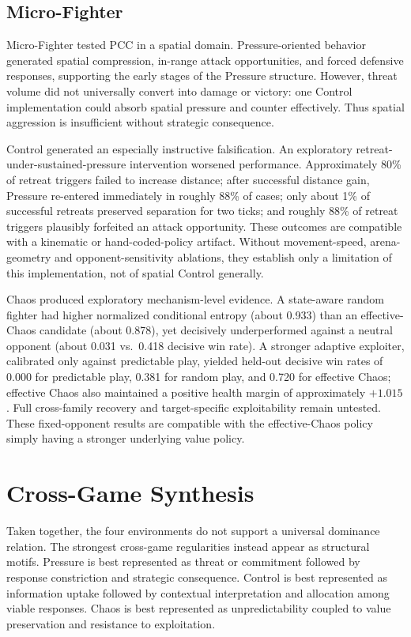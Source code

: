 \documentclass[journal]{IEEEtran}
\begin{document}
\subsection{Micro-Fighter}

Micro-Fighter tested PCC in a spatial domain. Pressure-oriented behavior generated spatial compression, in-range attack opportunities, and forced defensive responses, supporting the early stages of the Pressure structure. However, threat volume did not universally convert into damage or victory: one Control implementation could absorb spatial pressure and counter effectively. Thus spatial aggression is insufficient without strategic consequence.

Control generated an especially instructive falsification. An exploratory retreat-under-sustained-pressure intervention worsened performance. Approximately 80\% of retreat triggers failed to increase distance; after successful distance gain, Pressure re-entered immediately in roughly 88\% of cases; only about 1\% of successful retreats preserved separation for two ticks; and roughly 88\% of retreat triggers plausibly forfeited an attack opportunity. These outcomes are compatible with a kinematic or hand-coded-policy artifact. Without movement-speed, arena-geometry and opponent-sensitivity ablations, they establish only a limitation of this implementation, not of spatial Control generally.

Chaos produced exploratory mechanism-level evidence. A state-aware random fighter had higher normalized conditional entropy (about 0.933) than an effective-Chaos candidate (about 0.878), yet decisively underperformed against a neutral opponent (about 0.031 vs.\ 0.418 decisive win rate). A stronger adaptive exploiter, calibrated only against predictable play, yielded held-out decisive win rates of 0.000 for predictable play, 0.381 for random play, and 0.720 for effective Chaos; effective Chaos also maintained a positive health margin of approximately $+1.015$. Full cross-family recovery and target-specific exploitability remain untested. These fixed-opponent results are compatible with the effective-Chaos policy simply having a stronger underlying value policy.

\section{Cross-Game Synthesis}
\label{sec:synthesis}

Taken together, the four environments do not support a universal dominance relation. The strongest cross-game regularities instead appear as structural motifs. Pressure is best represented as threat or commitment followed by response constriction and strategic consequence. Control is best represented as information uptake followed by contextual interpretation and allocation among viable responses. Chaos is best represented as unpredictability coupled to value preservation and resistance to exploitation.
\end{document}
